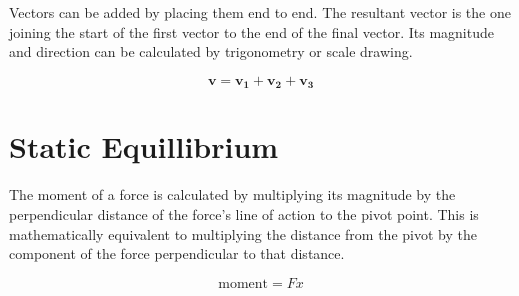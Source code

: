 \documentclass[main.tex]{subfiles}
\begin{document}

Vectors can be added by placing them end to end. The resultant vector is the one joining the start of the first vector to the end of the final vector. Its magnitude and direction can be calculated by trigonometry or scale drawing.

\begin{figure}[h]
	\begin{center}
	$$\mathbf{v} = \mathbf{v_1}+\mathbf{v_2}+\mathbf{v_3}$$
	\end{center}
\end{figure}

\section{Static Equillibrium}


The moment of a force is calculated by multiplying its magnitude by the perpendicular distance of the force's line of action to the pivot point. This is mathematically equivalent to multiplying the distance from the pivot by the component of the force perpendicular to that distance.

\begin{figure}[h]
	\centering
	$$\mathrm{moment} = Fx $$
\end{figure}
\end{document}
